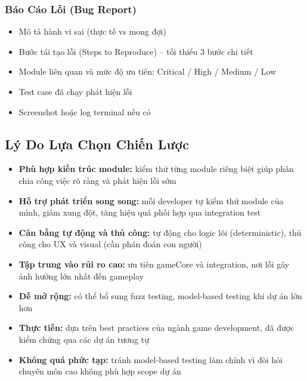 \documentclass[12pt,a4paper]{article}
\begin{document}
\subsubsection{Báo Cáo Lỗi (Bug Report)}
\begin{itemize}[leftmargin=3em]
  \item Mô tả hành vi sai (thực tế vs mong đợi)
  \item Bước tái tạo lỗi (Steps to Reproduce) – tối thiểu 3 bước chi tiết
  \item Module liên quan và mức độ ưu tiên: Critical / High / Medium / Low
  \item Test case đã chạy phát hiện lỗi
  \item Screenshot hoặc log terminal nếu có
\end{itemize}

\subsection{Lý Do Lựa Chọn Chiến Lược}

\begin{itemize}[leftmargin=3em]
  \item \textbf{Phù hợp kiến trúc module:} kiểm thử từng module riêng biệt giúp phân chia công việc rõ ràng và phát hiện lỗi sớm
  \item \textbf{Hỗ trợ phát triển song song:} mỗi developer tự kiểm thử module của mình, giảm xung đột, tăng hiệu quả phối hợp qua integration test
  \item \textbf{Cân bằng tự động và thủ công:} tự động cho logic lõi (deterministic), thủ công cho UX và visual (cần phán đoán con người)
  \item \textbf{Tập trung vào rủi ro cao:} ưu tiên gameCore và integration, nơi lỗi gây ảnh hưởng lớn nhất đến gameplay
  \item \textbf{Dễ mở rộng:} có thể bổ sung fuzz testing, model-based testing khi dự án lớn hơn
  \item \textbf{Thực tiễn:} dựa trên best practices của ngành game development, đã được kiểm chứng qua các dự án tương tự
  \item \textbf{Không quá phức tạp:} tránh model-based testing làm chính vì đòi hỏi chuyên môn cao không phù hợp scope dự án
\end{itemize}

\end{document}

